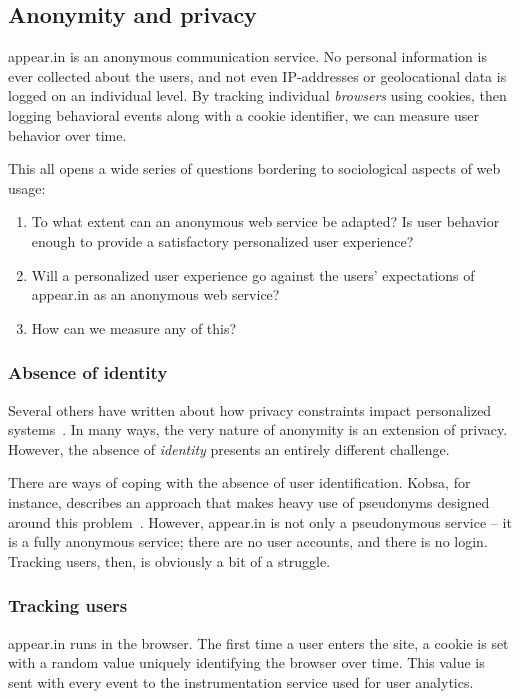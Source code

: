 \subsection{Anonymity and privacy}

appear.in is an anonymous communication service. No personal information is ever collected about the users, and not even IP-addresses or geolocational data is logged on an individual level. By tracking individual \emph{browsers} using cookies, then logging behavioral events along with a cookie identifier, we can measure user behavior over time.

This all opens a wide series of questions bordering to sociological aspects of web usage:

\begin{enumerate}
  \item
    To what extent can an anonymous web service be adapted?
    Is user behavior enough to provide a satisfactory personalized user experience?
  \item
    Will a personalized user experience go against the users' expectations of appear.in as an anonymous web service?
  \item
    How can we measure any of this?
\end{enumerate}

\subsubsection{Absence of identity} %

Several others have written about how privacy constraints impact personalized systems~\cite{Teltzrow2004,Kobsa2007}. In many ways, the very nature of anonymity is an extension of privacy. However, the absence of \emph{identity} presents an entirely different challenge.

There are ways of coping with the absence of user identification. Kobsa, for instance, describes an approach that makes heavy use of pseudonyms designed around this problem~\cite{Kobsa2003}.
However, appear.in is not only a pseudonymous service -- it is a fully anonymous service; there are no user accounts, and there is no login.
Tracking users, then, is obviously a bit of a struggle.

\subsubsection{Tracking users}

appear.in runs in the browser. The first time a user enters the site, a cookie is set with a random value uniquely identifying the browser over time. This value is sent with every event to the instrumentation service used for user analytics.

